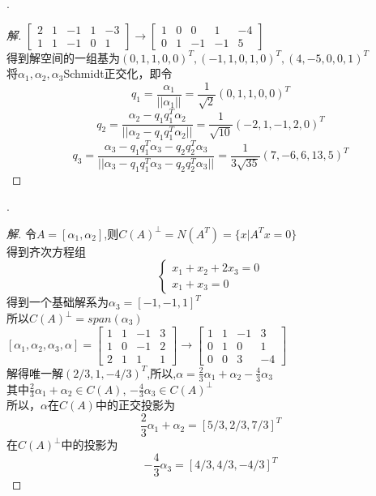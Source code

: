 \documentclass[10pt,a4paper]{report}
\begin{document}
.
\begin{proof}[解]
	$\left[
	\begin{matrix}
	2 & 1 & -1 & 1 & -3\\
	1 & 1 & -1 & 0 & 1 
	\end{matrix}
	\right] \rightarrow \left[
	\begin{matrix}
	1 & 0 & 0 & 1 & -4\\
	0 & 1 & -1 & -1 & 5
	\end{matrix}
	\right]$\\
	得到解空间的一组基为$(0,1,1,0,0)^{T},(-1,1,0,1,0)^{T},(4,-5,0,0,1)^{T}$\\
	将$\alpha_{1},\alpha_{2},\alpha_{3}$Schmidt正交化，即令\\
	$$
	q_{1} = \frac{\alpha_{1}}{||\alpha_{1}||} = \frac{1}{\sqrt{2}}(0,1,1,0,0)^{T}
	$$
	$$
	q_{2} = \frac{\alpha_{2}-q_{1}q_{1}^{T}\alpha_{2}}{||\alpha_{2}-q_{1}q_{1}^{T}\alpha_{2}||} = \frac{1}{\sqrt{10}}(-2,1,-1,2,0)^{T}
	$$
	$$
	q_{3} = \frac{\alpha_{3}-q_{1}q_{1}^{T}\alpha_{3}-q_{2}q_{2}^{T}\alpha_{3}}{||\alpha_{3}-q_{1}q_{1}^{T}\alpha_{3}-q_{2}q_{2}^{T}\alpha_{3}||} = \frac{1}{3\sqrt{35}}(7,-6,6,13,5)^{T}
	$$
\end{proof}
.
\begin{proof}[解]
	令$A=[\alpha_{1},\alpha_{2}]$,则$C(A)^{\perp} = N(A^{T}) = \{x|A^{T}x=0\}$\\
	得到齐次方程组\\
	$$
	\left\{
	\begin{aligned}
	x_{1}+x_{2}+2x_{3}=0\\
	x_{1}+x_{3}=0
	\end{aligned}
	\right.
	$$
	得到一个基础解系为$\alpha_{3} = [-1,-1,1]^{T}$\\
	所以$C(A)^{\perp} = span(\alpha_{3})$\\
	$[\alpha_{1},\alpha_{2},\alpha_{3},\alpha] = \left[
	\begin{matrix}
	1 & 1 & -1 & 3\\
	1 & 0 & -1 & 2 \\
	2 & 1 & 1 & 1
	\end{matrix}
	\right] \rightarrow \left[
	\begin{matrix}
	1 & 1 & -1 & 3\\
	0 & 1 & 0 & 1 \\
	0 & 0 & 3 & -4
	\end{matrix}
	\right]$\\
	解得唯一解$(2/3,1,-4/3)^{T}$,所以,$\alpha = \frac{2}{3}\alpha_{1}+\alpha_{2}-\frac{4}{3}\alpha_{3}$\\
	其中$\frac{2}{3}\alpha_{1}+\alpha_{2} \in C(A)$, $-\frac{4}{3}\alpha_{3} \in C(A)^{\perp}$\\
	所以，$\alpha$在$C(A)$中的正交投影为
	$$\frac{2}{3}\alpha_{1}+\alpha_{2} = [5/3,2/3,7/3]^{T}$$
	在$C(A)^{\perp}$中的投影为
	$$-\frac{4}{3}\alpha_{3} = [4/3,4/3,-4/3]^{T}$$
\end{proof}
\end{document}
